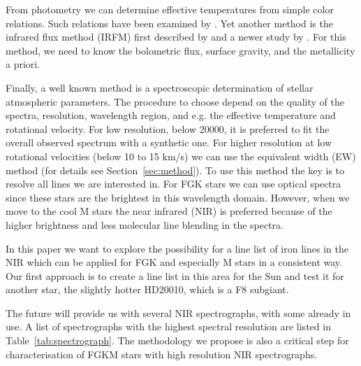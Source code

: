 \documentclass{aa}
\begin{document}
From photometry we can determine effective temperatures from
simple color relations. Such relations have been examined by
\cite{Ramirez2005a}. Yet another method is the infrared flux method
(IRFM) first described by \cite{Blackwell1977} and a newer study by
\cite{Ramirez2005b,Casagrande2010}. For this method, we need to know the
bolometric flux, surface gravity, and the metallicity a priori.

Finally, a well known method is a spectroscopic determination of stellar
atmospheric parameters. The procedure to choose depend on the quality
of the spectra, resolution, wavelength region, and e.g. the effective
temperature and rotational velocity. For low resolution, below 20000,
it is preferred to fit the overall observed spectrum with a synthetic
one. For higher resolution at low rotational velocities (below 10 to 15
\si{km/s}) we can use the equivalent width (EW) method (for details see
Section~\ref{sec:method}). To use this method the key is to resolve all
lines we are interested in. For FGK stars we can use optical spectra
since these stars are the brightest in this wavelength domain. However,
when we move to the cool M stars the near infrared (NIR) is preferred
because of the higher brightness and less molecular line blending in the
spectra.

In this paper we want to explore the possibility for a line list of iron
lines in the NIR which can be applied for FGK and especially M stars
in a consistent way. Our first approach is to create a line list in
this area for the Sun and test it for another star, the slightly hotter
HD20010, which is a F8 subgiant.

The future will provide us with several NIR spectrographs, with some
already in use. A list of spectrographs with the highest spectral
resolution are listed in Table~\ref{tab:spectrograph}. The methodology
we propose is also a critical step for characterisation of FGKM stars
with high resolution NIR spectrographs.
\end{document}
